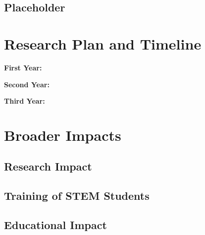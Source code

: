 \documentclass[11pt]{article}
\theoremstyle{theorem}
\theoremstyle{definition}
\begin{document}
\subsection{Placeholder}


\section{Research Plan and Timeline}


\noindent\textbf{First Year:}  

\noindent\textbf{Second Year:}  

\noindent\textbf{Third Year:}  
\section{Broader Impacts}

\subsection{Research Impact}


\subsection{Training of STEM Students}

\subsection{Educational Impact}    


\newpage

\end{document}
